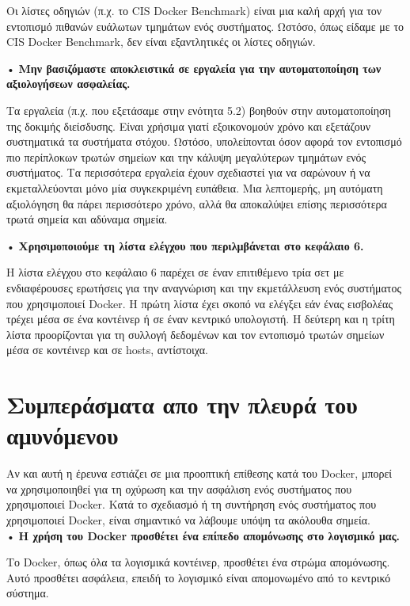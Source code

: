 Οι λίστες οδηγιών (π.χ. το \textlatin{CIS Docker Benchmark}) είναι μια καλή αρχή
για τον εντοπισμό πιθανών ευάλωτων τμημάτων ενός συστήματος. Ωστόσο, όπως
είδαμε με το \textlatin{CIS Docker Benchmark}, δεν είναι εξαντλητικές οι λίστες
οδηγιών.

• \textbf{Μην βασιζόμαστε αποκλειστικά σε εργαλεία για την αυτοματοποίηση των
αξιολογήσεων ασφαλείας.}

Τα εργαλεία (π.χ. που εξετάσαμε στην ενότητα 5.2) βοηθούν στην αυτοματοποίηση
της δοκιμής διείσδυσης. Είναι χρήσιμα γιατί εξοικονομούν χρόνο και εξετάζουν
συστηματικά τα συστήματα στόχου. Ωστόσο, υπολείπονται όσον αφορά τον εντοπισμό
πιο περίπλοκων τρωτών σημείων και την κάλυψη μεγαλύτερων τμημάτων ενός
συστήματος. Τα περισσότερα εργαλεία έχουν σχεδιαστεί για να σαρώνουν ή να
εκμεταλλεύονται μόνο μία συγκεκριμένη ευπάθεια. Μια λεπτομερής, μη αυτόματη
αξιολόγηση θα πάρει περισσότερο χρόνο, αλλά θα αποκαλύψει επίσης περισσότερα
τρωτά σημεία και αδύναμα σημεία.

• \textbf{Χρησιμοποιούμε τη λίστα ελέγχου που περιλμβάνεται στο κεφάλαιο 6.}

Η λίστα ελέγχου στο κεφάλαιο 6 παρέχει σε έναν επιτιθέμενο τρία σετ με
ενδιαφέρουσες ερωτήσεις για την αναγνώριση και την εκμετάλλευση ενός
συστήματος που χρησιμοποιεί \textlatin{Docker}. Η πρώτη λίστα έχει σκοπό να
ελέγξει εάν ένας εισβολέας τρέχει μέσα σε ένα κοντέινερ ή σε έναν κεντρικό
υπολογιστή. Η δεύτερη και η τρίτη λίστα προορίζονται για τη συλλογή δεδομένων
και τον εντοπισμό τρωτών σημείων μέσα σε κοντέινερ και σε \textlatin{hosts},
αντίστοιχα.


\section{Συμπεράσματα απο την πλευρά του αμυνόμενου}

Αν και αυτή η έρευνα εστιάζει σε μια προοπτική επίθεσης κατά του
\textlatin{Docker}, μπορεί να χρησιμοποιηθεί για τη οχύρωση και την ασφάλιση
ενός συστήματος που χρησιμοποιεί \textlatin{Docker}. Κατά το σχεδιασμό ή τη
συντήρηση ενός συστήματος που χρησιμοποιεί \textlatin{Docker}, είναι σημαντικό να
λάβουμε υπόψη τα ακόλουθα σημεία. \\

• \textbf{Η χρήση του \textlatin{Docker} προσθέτει ένα επίπεδο απομόνωσης στο
λογισμικό μας.}

Το \textlatin{Docker}, όπως όλα τα λογισμικά κοντέινερ, προσθέτει ένα στρώμα
απομόνωσης. Αυτό προσθέτει ασφάλεια, επειδή το λογισμικό είναι απομονωμένο από
το κεντρικό σύστημα.

